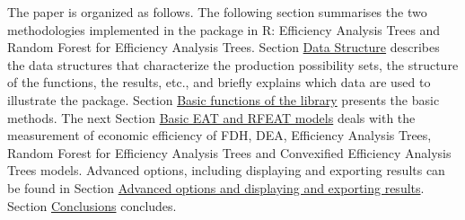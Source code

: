 The paper is organized as follows. The following section summarises the two methodologies implemented in the  package in R: Efficiency Analysis Trees and Random Forest for Efficiency Analysis Trees. Section \protect\hyperlink{section3}{Data Structure} describes the data structures that characterize the production possibility sets, the structure of the functions, the results, etc., and briefly explains which data are used to illustrate the package. Section \protect\hyperlink{section4}{Basic functions of the library} presents the basic methods. The next Section \protect\hyperlink{section5}{Basic EAT and RFEAT models} deals with the measurement of economic efficiency of FDH, DEA, Efficiency Analysis Trees, Random Forest for Efficiency Analysis Trees and Convexified Efficiency Analysis Trees models. Advanced options, including displaying and exporting results can be found in Section \protect\hyperlink{section6}{Advanced options and displaying and exporting results}. Section \protect\hyperlink{section7}{Conclusions} concludes.


